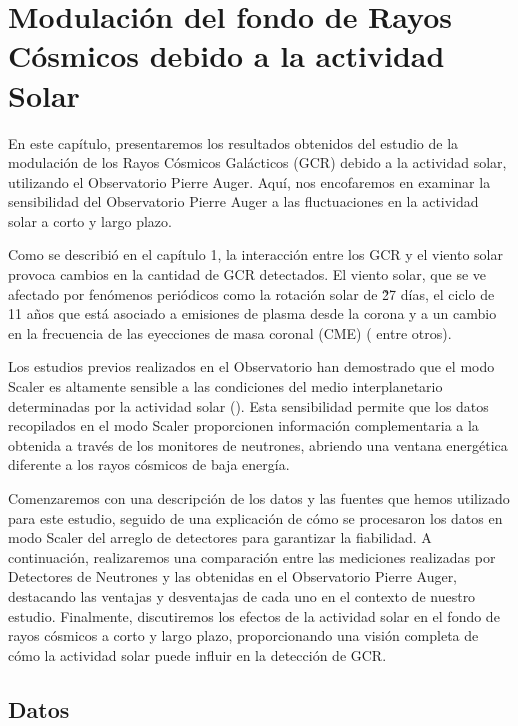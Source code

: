 
\newpage
\chapter{Modulación del fondo de Rayos Cósmicos debido a la actividad Solar}

En este capítulo, presentaremos los resultados obtenidos del estudio de la modulación de los Rayos Cósmicos Galácticos (GCR) debido a la actividad solar, utilizando el Observatorio Pierre Auger. Aquí, nos encofaremos en examinar la sensibilidad del Observatorio Pierre Auger a las fluctuaciones en la actividad solar a corto y largo plazo.

Como se describió en el capítulo 1, la interacción entre los GCR y el viento solar provoca cambios en la cantidad de GCR detectados. El viento solar, que se ve afectado por fenómenos periódicos como la rotación solar de \~27 días, el ciclo de 11 años que está asociado a emisiones de plasma desde la corona y a un cambio en la frecuencia de las eyecciones de masa coronal (CME) (\cite{belov_2021} entre otros).

Los estudios previos realizados en el Observatorio han demostrado que el modo Scaler es altamente sensible a las condiciones del medio interplanetario determinadas por la actividad solar (\cite{Martin_Schimassek2022}). Esta sensibilidad permite que los datos recopilados en el modo Scaler proporcionen información complementaria a la obtenida a través de los monitores de neutrones, abriendo una ventana energética diferente a los rayos cósmicos de baja energía.

Comenzaremos con una descripción de los datos y las fuentes que hemos utilizado para este estudio, seguido de una explicación de cómo se procesaron los datos en modo Scaler del arreglo de detectores para garantizar la fiabilidad. A continuación, realizaremos una comparación entre las mediciones realizadas por Detectores de Neutrones y las obtenidas en el Observatorio Pierre Auger, destacando las ventajas y desventajas de cada uno en el contexto de nuestro estudio. Finalmente, discutiremos los efectos de la actividad solar en el fondo de rayos cósmicos a corto y largo plazo, proporcionando una visión completa de cómo la actividad solar puede influir en la detección de GCR.

\section{Datos}

